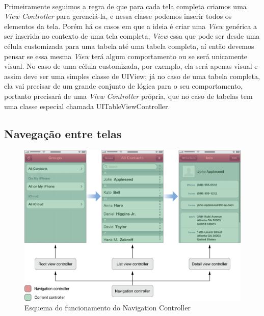 \documentclass[a4paper,12pt,brazil,doubleside]{book}
\begin{document}
\paragraph{}Primeiramente seguimos a regra de que para cada tela completa criamos uma \emph{View Controller} para gerenciá-la, e nessa classe podemos inserir todos os elementos da tela. Porém há os casos em que a ideia é criar uma \emph{View} genérica a ser inserida no contexto de uma tela completa, \emph{View} essa que pode ser desde uma célula customizada para uma tabela até uma tabela completa, aí então devemos pensar se essa mesma \emph{View} terá algum comportamento ou se será unicamente visual. No caso de uma célula customizada, por exemplo, ela será apenas visual e assim deve ser uma simples classe de UIView; já no caso de uma tabela completa, ela vai precisar de um grande conjunto de lógica para o seu comportamento, portanto precisará de uma \emph{View Controller} própria, que no caso de tabelas tem uma classe especial chamada UITableViewController.

\bigskip

\subsection{Navegação entre telas}

\bigskip

\begin{figure}[h]
  \centering
  \includegraphics[totalheight=0.35\textheight]{../figuras/ios/apple_navigation_interface.png}
  \caption{Esquema do funcionamento do Navigation Controller}
  \label{fig:a}
\end{figure}
\end{document}
